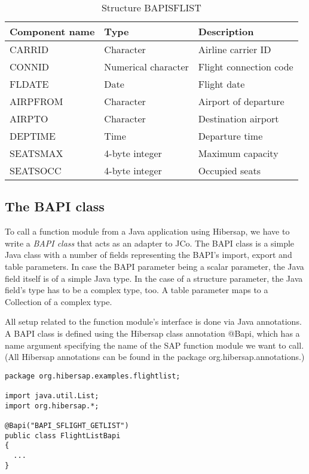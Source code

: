 \begin{table}[H]
  \centering
  \begin{tabular}{lll} \toprule
    \textbf{Component name} & \textbf{Type}        & \textbf{Description} \\ \midrule
    CARRID                  & Character            & Airline carrier ID \\ 
    CONNID                  & Numerical character  & Flight connection code \\ 
    FLDATE                  & Date                 & Flight date \\ 
    AIRPFROM                & Character            & Airport of departure \\ 
    AIRPTO                  & Character            & Destination airport \\ 
    DEPTIME                 & Time                 & Departure time \\ 
    SEATSMAX                & 4-byte integer       & Maximum capacity \\ 
    SEATSOCC                & 4-byte integer       & Occupied seats \\ \bottomrule
  \end{tabular}
  \caption{Structure BAPISFLIST}
  \label{tab:Bapisflist}
\end{table}


\subsection{The BAPI class}

To call a function module from a Java application using Hibersap, we have to write a \textit{BAPI class} that acts as
an adapter to JCo. The BAPI class is a simple Java class with a number of fields representing the BAPI's import,
export and table parameters. In case the BAPI parameter being a scalar parameter, the Java field itself is of a
simple Java type. In the case of a structure parameter, the Java field's type has to be a complex type, too.
A table parameter maps to a Collection of a complex type.

All setup related to the function module's interface is done via Java annotations.
A BAPI class is defined using the Hibersap class annotation @Bapi,
which has a name argument specifying the name of the SAP function module we want to call.
(All Hibersap annotations can be found in the package org.hibersap.annotations.)

\begin{lstlisting}[caption=The BAPI class]
package org.hibersap.examples.flightlist;

import java.util.List;
import org.hibersap.*;

@Bapi("BAPI_SFLIGHT_GETLIST")
public class FlightListBapi
{
  ...
}
\end{lstlisting}

